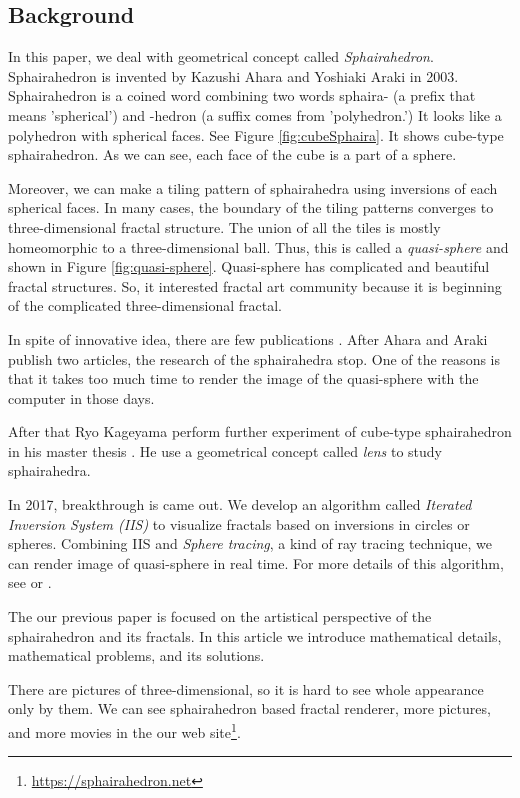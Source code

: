 \documentclass[dvipdfmx]{interact}
\theoremstyle{plain}%
\theoremstyle{definition}
\theoremstyle{remark}
\theoremstyle{problemstyle}
\begin{document}
\subsection{Background}

In this paper, we deal with geometrical concept called
\textit{Sphairahedron}. Sphairahedron is invented by Kazushi Ahara and
Yoshiaki Araki \cite{AharaAraki} in 2003. Sphairahedron is a coined word
combining two words sphaira- (a prefix that means 'spherical') and
-hedron (a suffix comes from 'polyhedron.') It looks like a polyhedron
with spherical faces. See Figure \ref{fig:cubeSphaira}. It shows cube-type
sphairahedron. As we can see, each face of the cube is a part of a
sphere.

Moreover, we can make a tiling pattern of sphairahedra using inversions
of each spherical faces. In many cases, the boundary of the tiling
patterns converges to three-dimensional fractal structure. 
The union of all the tiles is mostly homeomorphic to a three-dimensional
ball. Thus, this is called a \textit{quasi-sphere} and shown in Figure
\ref{fig:quasi-sphere}.
Quasi-sphere has complicated and beautiful fractal structures.
So, it interested fractal art community because it is beginning of
the complicated three-dimensional fractal.

In spite of innovative idea, there are few publications
\cite{AharaAraki}\cite{AharaJa}.
After Ahara and Araki publish two articles, the research of the
sphairahedra stop. 
One of the reasons is that it takes too much time to render the image of
the quasi-sphere with the computer in those days.

After that Ryo Kageyama perform further experiment of
cube-type sphairahedron in his master thesis \cite{kageyama}. 
He use a geometrical concept called \textit{lens} to study sphairahedra. 

In 2017, breakthrough is came out. We develop an algorithm called
\textit{Iterated Inversion System (IIS)} to visualize fractals based on
inversions in circles or spheres.
Combining IIS and \textit{Sphere tracing}, a kind of ray tracing
technique, we can render image of quasi-sphere in real time.
For more details of this algorithm, see
\cite{bridges2016} or \cite{bridges2017}.

The our previous paper \cite{bridges2018} is focused on the artistical
perspective of the sphairahedron and its fractals.
In this article we introduce mathematical details,
mathematical problems, and its solutions. 

There are pictures of three-dimensional, so it is hard to see whole
appearance only by them. We can see sphairahedron based fractal renderer,
 more pictures, and more movies in the
our web site\footnote{\url{https://sphairahedron.net}}.
\end{document}
